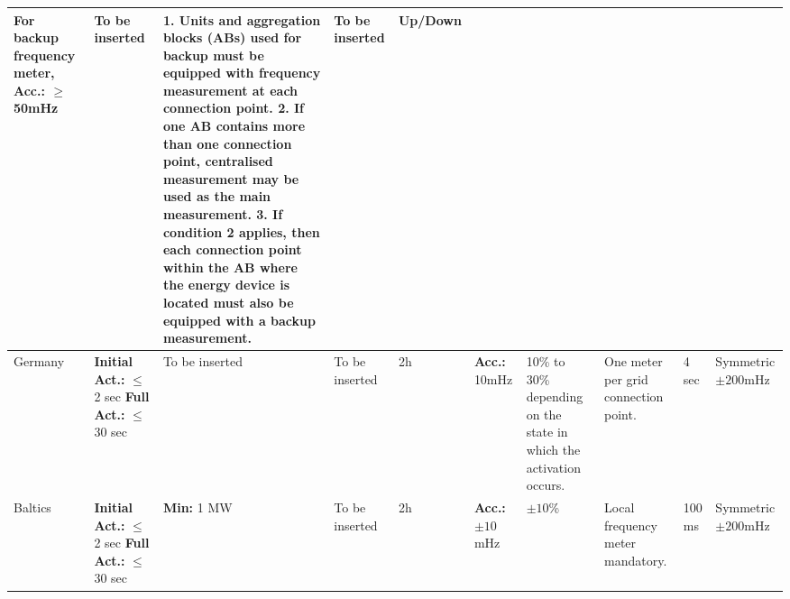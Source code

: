 \begin{landscape}
\begin{longtable}{|p{1.8cm}|p{2.2cm}|p{2.2cm}|p{2.2cm}|p{2.5cm}|p{1.5cm}|p{2.2cm}|p{4cm}|p{2.5cm}|p{2cm}|}
For backup frequency meter,
\newline \textbf{Acc.: }$\geq$ 50mHz  
& To be inserted 
& 
1. Units and aggregation blocks (ABs) used for backup must be equipped with frequency measurement at each connection point.
2. If one AB contains more than one connection point, centralised measurement may be used as the main measurement.
3. If condition 2 applies, then each connection point within the AB where the energy device is located must also be equipped with a backup measurement.
& To be inserted & 
Up/Down \\
\hline
Germany 
& 
\textbf{Initial Act.:} $\leq$ 2 sec \newline
\textbf{Full Act.:} $\leq$ 30 sec 
& To be inserted & To be inserted & 2h & \textbf{Acc.: }10mHz & 
10\% to 30\% depending on the state in which the activation occurs.
& 
One meter per grid connection point.
& 
4 sec 
& 
Symmetric $\pm 200$mHz \\
\hline
Baltics 
&
\textbf{Initial Act.:} $\leq$ 2 sec \newline
\textbf{Full Act.:} $\leq$ 30 sec
&
\textbf{Min: }1 MW
& To be inserted 
& 
2h & 
\textbf{Acc.: } $\pm 10$mHz
& 
$\pm 10$\%
& 
Local frequency meter mandatory.
& 
100 ms
& Symmetric $\pm 200$mHz \\
\hline
\end{longtable}
\normalsize
\end{landscape}




